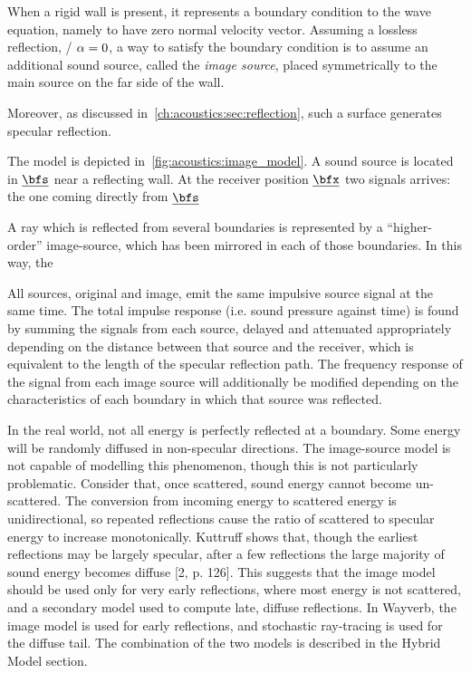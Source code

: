 When a rigid wall is present, it represents a boundary condition to the wave equation, namely to have zero normal velocity vector.
Assuming a lossless reflection, \ie/ $\alpha = 0$, a way to satisfy the boundary condition is to assume
an additional sound source, called the \textit{image source}, placed symmetrically to the main source on the far side of the wall.

Moreover, as discussed in~\cref{ch:acoustics:sec:reflection}, such a surface generates specular reflection.

The model is depicted in~\cref{fig:acoustics:image_model}.
A sound source is located in $\positionSource$ near a reflecting wall.
At the receiver position $\positionMicrophone$ two signals arrives: the one coming directly from $\positionSource$

A ray which is reflected from several boundaries is represented by a “higher-order” image-source,
which has been mirrored in each of those boundaries\cite{Kuttruff}. In this way, the

All sources, original and image, emit the same impulsive source signal at the same time. The total impulse response (i.e. sound pressure against time) is found by summing the signals from each source, delayed and attenuated appropriately depending on the distance between that source and the receiver, which is equivalent to the length of the specular reflection path. The frequency response of the signal from each image source will additionally be modified depending on the characteristics of each boundary in which that source was reflected.

In the real world, not all energy is perfectly reflected at a boundary.
Some energy will be randomly diffused in non-specular directions.
The image-source model is not capable of modelling this phenomenon, though this is not particularly problematic.
Consider that, once scattered, sound energy cannot become un-scattered.
The conversion from incoming energy to scattered energy is unidirectional, so repeated reflections cause the ratio of scattered to specular energy to increase monotonically.
Kuttruff shows that, though the earliest reflections may be largely specular, after a few reflections the large majority of sound energy becomes diffuse [2, p. 126].
This suggests that the image model should be used only for very early reflections, where most energy is not scattered, and a secondary model used to compute late, diffuse reflections.
In Wayverb, the image model is used for early reflections, and stochastic ray-tracing is used for the diffuse tail.
The combination of the two models is described in the Hybrid Model section.

